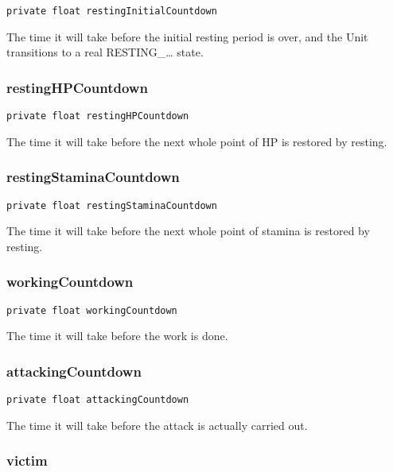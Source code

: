 \documentclass[11pt]{article}
\begin{document}
\begin{verbatim}
private float restingInitialCountdown
\end{verbatim}

The time it will take before the initial resting period is over, and the Unit
transitions to a real RESTING\_\ldots{} state.


\subsubsection{restingHPCountdown}
\label{sec-7-2-6}

\begin{verbatim}
private float restingHPCountdown
\end{verbatim}

The time it will take before the next whole point of HP is restored by resting.


\subsubsection{restingStaminaCountdown}
\label{sec-7-2-7}

\begin{verbatim}
private float restingStaminaCountdown
\end{verbatim}

The time it will take before the next whole point of stamina is restored by
resting.


\subsubsection{workingCountdown}
\label{sec-7-2-8}

\begin{verbatim}
private float workingCountdown
\end{verbatim}

The time it will take before the work is done.


\subsubsection{attackingCountdown}
\label{sec-7-2-9}

\begin{verbatim}
private float attackingCountdown
\end{verbatim}

The time it will take before the attack is actually carried out.


\subsubsection{victim}
\label{sec-7-2-10}
\end{document}
